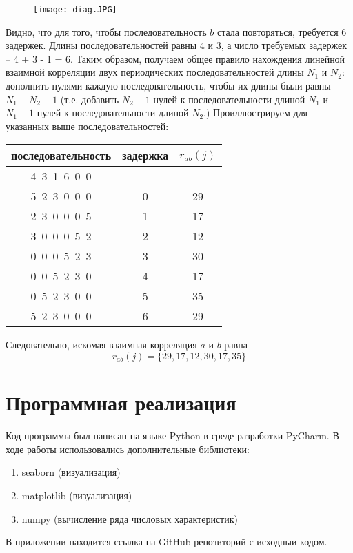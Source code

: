 \documentclass{article}
\begin{document}
\begin{figure}[H]
		\centering
		\texttt{[image: diag.JPG]}
		\label{fig:diag}
	\end{figure}
\noindent Видно, что для того, чтобы последовательность $b$ стала повторяться, требуется 6 задержек. Длины последовательностей равны 4 и 3, а число требуемых задержек -- 4 + 3 - 1 = 6. Таким образом, получаем общее правило нахождения линейной взаимной корреляции двух периодических последовательностей длины $N_1$ и $N_2$: дополнить нулями каждую последовательность, чтобы их длины были равны $N_1+N_2-1$ (т.е. добавить $N_2-1$ нулей к последовательности длиной $N_1$ и $N_1-1$ нулей к последовательности длиной $N_2$.) Проиллюстрируем для указанных выше последовательностей:

\begin{table}[H]
    \centering
    \begin{tabular}{|c|c|c|}
    \hline 
         последовательность & задержка & $r_{ab}(j)$  \\
         \hline \hline
         4~3~1~6~0~0 & & \\
         \hline
         5~2~3~0~0~0 & 0 & 29\\ \hline
         2~3~0~0~0~5 & 1 & 17\\ \hline
         3~0~0~0~5~2 & 2 & 12\\ \hline
         0~0~0~5~2~3 & 3 & 30\\ \hline
         0~0~5~2~3~0 & 4 & 17\\ \hline
         0~5~2~3~0~0 & 5 & 35\\ \hline
         5~2~3~0~0~0 & 6 & 29\\
     \hline    
    \end{tabular}
    \label{tab:my_label}
\end{table}
\noindent Следовательно, искомая взаимная корреляция $a$ и $b$ равна
$$r_{ab}(j)=\{29,17,12,30,17,35\}$$

\section{Программная реализация}
\noindent Код программы был написан на языке Python в среде разработки PyCharm. В ходе работы использовались дополнительные библиотеки:
 \begin{enumerate}
        \item seaborn (визуализация)
        \item matplotlib (визуализация)
        \item numpy (вычисление ряда числовых характеристик)
    \end{enumerate}
В приложении находится ссылка на GitHub репозиторий с исходныи кодом.
\end{document}
